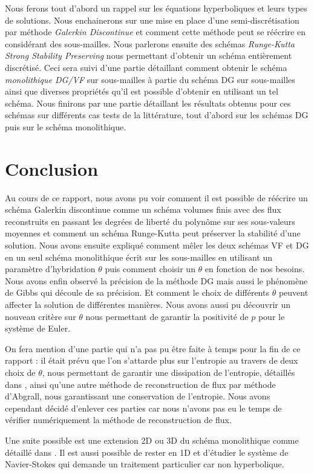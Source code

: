 \documentclass[16pt]{article}%
\begin{document}
Nous ferons tout d'abord un rappel sur les équations hyperboliques et leurs types de solutions. 
Nous enchainerons sur une mise en place d'une semi-discrétisation par méthode \emph{Galerkin Discontinue} 
et comment cette méthode peut se réécrire en considérant des sous-mailles.
Nous parlerons ensuite des schémas \emph{Runge-Kutta Strong Stability Preserving} nous permettant d'obtenir un schéma entièrement discrétisé.
Ceci sera suivi d'une partie détaillant comment obtenir le schéma \emph{monolithique DG/VF} sur sous-mailles à partie du schéma DG sur sous-mailles 
ainsi que diverses propriétés qu'il est possible d'obtenir en utilisant un tel schéma. 
Nous finirons par une partie détaillant les résultats obtenus pour ces schémas sur différents cas tests de la littérature,
tout d'abord sur les schémas DG puis sur le schéma monolithique.

\newpage




\section{Conclusion}

Au cours de ce rapport, nous avons pu voir comment il est possible de réécrire un schéma Galerkin discontinue comme un schéma volumes finis avec des flux reconstruits
en passant les degrées de liberté du polynôme sur ses sous-valeurs moyennes et comment un schéma Runge-Kutta peut préserver la stabilité d'une solution.
Nous avons ensuite expliqué comment mêler les deux schémas VF et DG en un seul schéma monolithique écrit sur les sous-mailles en utilisant un paramètre d'hybridation $\theta$
puis comment choisir un $\theta$ en fonction de nos besoins.
Nous avons enfin observé la précision de la méthode DG mais aussi le phénomène de Gibbs qui découle de sa précision. 
Et comment le choix de différents $\theta$ peuvent affecter la solution de différentes manières.
Nous avons aussi pu découvrir un nouveau critère sur $\theta$ nous permettant de garantir la positivité de $p$ pour le système de Euler.

On fera mention d'une partie qui n'a pas pu être faite à temps pour la fin de ce rapport : 
il était prévu que l'on s'attarde plus sur l'entropie au travers de deux choix de $\theta$, nous permettant de garantir une dissipation de l'entropie, détaillés dans \cite{VILAR2025},
ainsi qu'une autre méthode de reconstruction de flux par méthode d'Abgrall, nous garantissant une conservation de l'entropie. 
Nous avons cependant décidé d'enlever ces parties car nous n'avons pas eu le temps de vérifier numériquement la méthode de reconstruction de flux.

Une suite possible est une extension 2D ou 3D du schéma monolithique comme détaillé dans \cite{VILAR2025}. 
Il est aussi possible de rester en 1D et d'étudier le système de Navier-Stokes qui demande un traitement particulier car non hyperbolique.


\newpage
\printbibliography[
heading=bibintoc,
title={Bibliographie}
] %
\end{document}
